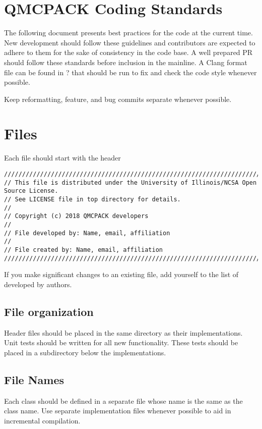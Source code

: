 \section{QMCPACK Coding Standards}

The following document presents best practices for the code at the current time. New development should follow these guidelines and contributors are expected to adhere to them for the sake of consistency in the code base. A well prepared PR should follow these standards before inclusion in the mainline. A Clang format file can be found in ? that should be run to fix and check the code style whenever possible.

Keep reformatting, feature, and bug commits separate whenever possible.  

\section{Files}
Each file should start with the header
\lstset{language=C++,style=C++}
\begin{lstlisting}
//////////////////////////////////////////////////////////////////////////////////////
// This file is distributed under the University of Illinois/NCSA Open Source License.
// See LICENSE file in top directory for details.
//
// Copyright (c) 2018 QMCPACK developers
//
// File developed by: Name, email, affiliation
//
// File created by: Name, email, affiliation
//////////////////////////////////////////////////////////////////////////////////////
\end{lstlisting}
If you make significant changes to an existing file, add yourself to the list of developed by authors.

\subsection{File organization}
Header files should be placed in the same directory as their implementations. 
Unit tests should be written for all new functionality. These tests should be placed in a  subdirectory below the implementations.

\subsection{File Names}
Each class should be defined in a separate file whose name is the same as the class name. Use separate  implementation files whenever possible to aid in incremental compilation. 

